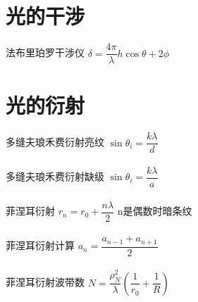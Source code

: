 \documentclass{article}
\begin{document}
\begin{multicols}{2}
\section{光的干涉}

法布里珀罗干涉仪 $\delta = \dfrac{4 \pi}{\lambda} h \cos \theta + 2 \phi $

\section{光的衍射}

多缝夫琅禾费衍射亮纹 $\sin \theta_i = \dfrac{k \lambda}{d} $
\\\\
多缝夫琅禾费衍射缺级 $\sin \theta_i = \dfrac{k \lambda}{a} $
\\\\
菲涅耳衍射 $r_n = r_0 + \dfrac{n \lambda}{2} $ n是偶数时暗条纹
\\\\
菲涅耳衍射计算 $a_n = \dfrac{a_{n-1} + a_{n+1}}{2} $
\\\\
菲涅耳衍射波带数 $N = \dfrac{\rho_N^2}{\lambda} \left( \dfrac{1}{r_0} + \dfrac{1}{R}   \right) $

\end{multicols}
\end{document}
